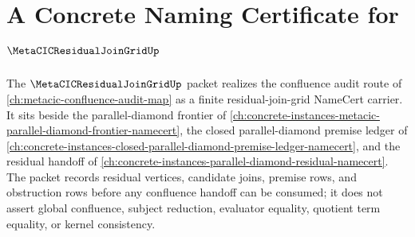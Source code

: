 \chapter{A Concrete Naming Certificate for $\MetaCICResidualJoinGridUp$}
\label{ch:concrete-instances-metacic-residual-join-grid-namecert}

The $\MetaCICResidualJoinGridUp$ packet realizes the confluence audit route of \autoref{ch:metacic-confluence-audit-map} as a finite residual-join-grid NameCert carrier. It sits beside the parallel-diamond frontier of \autoref{ch:concrete-instances-metacic-parallel-diamond-frontier-namecert}, the closed parallel-diamond premise ledger of \autoref{ch:concrete-instances-closed-parallel-diamond-premise-ledger-namecert}, and the residual handoff of \autoref{ch:concrete-instances-parallel-diamond-residual-namecert}. The packet records residual vertices, candidate joins, premise rows, and obstruction rows before any confluence handoff can be consumed; it does not assert global confluence, subject reduction, evaluator equality, quotient term equality, or kernel consistency.

